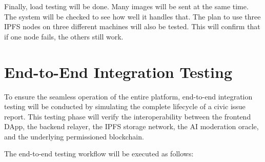 Finally, load testing will be done. Many images will be sent at the same time. The system will be checked to see how well it handles that. The plan to use three IPFS nodes on three different machines will also be tested. This will confirm that if one node fails, the others still work.
\section{End-to-End Integration Testing}

To ensure the seamless operation of the entire platform, end-to-end integration testing will be conducted by simulating the complete lifecycle of a civic issue report. This testing phase will verify the interoperability between the frontend DApp, the backend relayer, the IPFS storage network, the AI moderation oracle, and the underlying permissioned blockchain.

The end-to-end testing workflow will be executed as follows:

